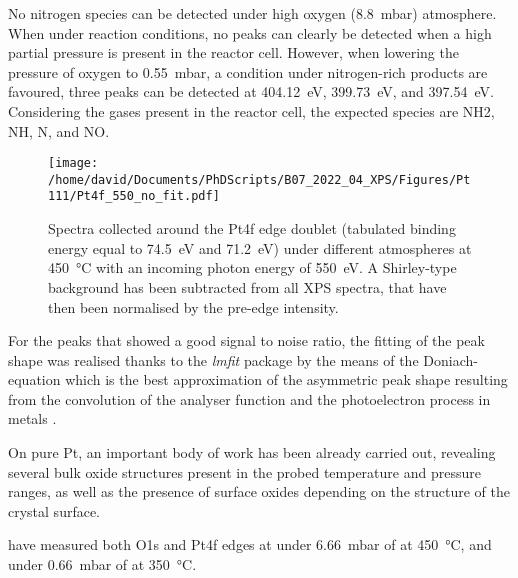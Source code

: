 No nitrogen species can be detected under high oxygen (\qty{8.8}{\milli\bar}) atmosphere.
When under reaction conditions, no peaks can clearly be detected when a high partial pressure is present in the reactor cell.
However, when lowering the pressure of oxygen to \qty{0.55}{\milli\bar}, a condition under nitrogen-rich products are favoured, three peaks can be detected at \qty{404.12}{\eV}, \qty{399.73}{\eV}, and \qty{397.54}{\eV}.
Considering the gases present in the reactor cell, the expected species are NH2, NH, N, and NO.


\begin{figure}[!htb]
    \centering
    \texttt{[image: /home/david/Documents/PhDScripts/B07\_2022\_04\_XPS/Figures/Pt111/Pt4f\_550\_no\_fit.pdf]}
    \caption{
        Spectra collected around the Pt4f edge doublet (tabulated binding energy equal to \qty{74.5}{\eV} and \qty{71.2}{\eV}) under different atmospheres at \qty{450}{\degreeCelsius} with an incoming photon energy of \qty{550}{\eV}.
        A Shirley-type background has been subtracted from all XPS spectra, that have then been normalised by the pre-edge intensity.
    }
    \label{fig:Pt4fPt111}
\end{figure}

For the peaks that showed a good signal to noise ratio, the fitting of the peak shape was realised thanks to the \textit{lmfit} \parencite{Newville2016} package by the means of the Doniach-equation which is the best approximation of the asymmetric peak shape resulting from the convolution of the analyser function and the photoelectron process in metals \parencite{Doniach1970}.

On pure Pt, an important body of work has been already carried out, revealing several bulk oxide structures present in the probed temperature and pressure ranges, as well as the presence of surface oxides depending on the structure of the crystal surface.

\cite{Miller2011} have measured both O1s and Pt4f edges at under \qty{6.66}{\milli\bar} of  at \qty{450}{\degreeCelsius}, and under \qty{0.66}{\milli\bar} of  at \qty{350}{\degreeCelsius}.